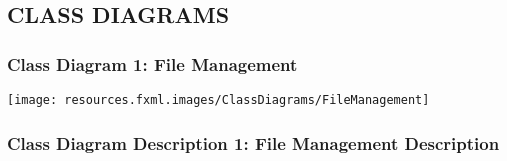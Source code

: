 \documentclass[twoside,letterpaper]{article}
\begin{document}
\subsection[Class Diagrams]{\rmfamily\bfseries\color{black} CLASS DIAGRAMS}
\hypertarget{RefHeading21659017292}{}{\color{black}

\subsubsection[Class Diagram 1: File Management]{\rmfamily\bfseries\color{black}
	Class Diagram 1: File Management}
\hypertarget{RefHeading22059017292}{}
\bigskip

\texttt{[image: resources.fxml.images/ClassDiagrams/FileManagement]}

\newpage

\subsubsection[Class Diagram Description 1: File Management Description]{\rmfamily\bfseries\color{black}
	Class Diagram Description 1: File Management Description}
\hypertarget{RefHeading22059017292}{}

}
\end{document}
